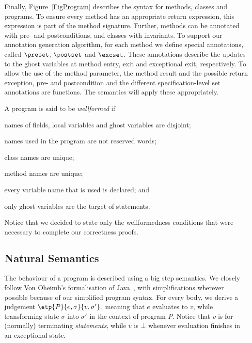 Finally, Figure~\ref{FigProgram} describes the syntax for methods,
classes and programs. To ensure every method has an appropriate return
expression, this expression is part of the method signature.  Further,
methods can be annotated with pre- and postconditions, and classes
with invariants. To support our annotation generation algorithm, for
each method we define special annotations, called
\(\preset\), \(\postset\) and \(\excset\). These annotations describe
the updates to the ghost variables at method entry, exit and
exceptional exit, respectively. To allow the use of the method
parameter, the method result and the possible return exception, pre-
and postcondition and the different specification-level set
annotations are functions. The semantics will apply these appropriately.

A program is said to be \emph{wellformed} if
\begin{inparaenum}
\item names of fields, local variables and ghost variables are
disjoint;
\item names used in the program are not reserved words;
\item class names are unique;
\item method names are unique;
\item every variable name that is used is declared; and
\item only ghost variables are the target of \Set statements.
\end{inparaenum}
Notice that we decided to state only the wellformedness conditions
that were necessary to complete our correctness proofs.

\subsection{Natural Semantics}\label{SecSemantics}
The behaviour of a program is described using a big step semantics. We
closely follow Von Oheimb's formalisation of Java~\cite{Oheimb01},
with simplifications wherever possible because of our simplified
program syntax. For every body, we derive a judgement
$\etp{P}{e,\sigma}{v,\sigma'}$, meaning that  $e$
evaluates to $v$, while transforming state $\sigma$ into $\sigma'$ in
the context of program \(P\). Notice that \(v\) is \One for
(normally) terminating \emph{statements}, while \(v\) is \(\bot\) whenever
evaluation finishes in an exceptional state.

